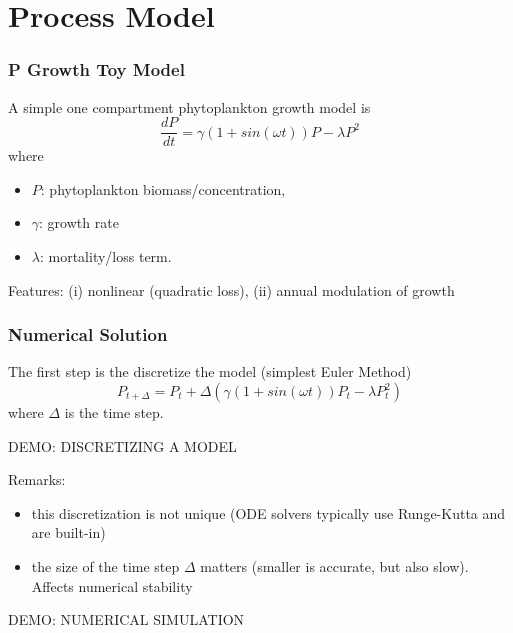 \documentclass{beamer}
\begin{document}
\section{Process Model}

\frame%
{\frametitle{P Growth Toy Model}

A simple one compartment phytoplankton growth model is
\[
\frac{d P}{dt} = \gamma(1 + sin (\omega t)) P - \lambda P^2
\]
where 
\begin{itemize}
\item
$P$: phytoplankton biomass/concentration, 
\item
$\gamma$: growth rate 
\item
$\lambda$: mortality/loss term. 
\end{itemize}


Features: (i) nonlinear (quadratic loss), (ii) annual modulation of growth

}

\frame%
{\frametitle{Numerical Solution}

The first step is the discretize the model (simplest Euler Method)
\[
P_{t+\Delta} = P_t + \Delta \left( \gamma (1+sin(\omega t)) P_t  - \lambda P_t^2 \right)
\]
where $\Delta$ is the time step. 

\medskip
\color{red}  DEMO: DISCRETIZING A MODEL

\medskip
Remarks: 
\begin{itemize}
\item
this discretization is not unique (ODE solvers typically use Runge-Kutta and are built-in) 
\item
the size of the time step $\Delta$ matters (smaller is accurate, but also slow). Affects numerical stability 
\end{itemize}

\color{red}  DEMO: NUMERICAL SIMULATION
}
\end{document}
